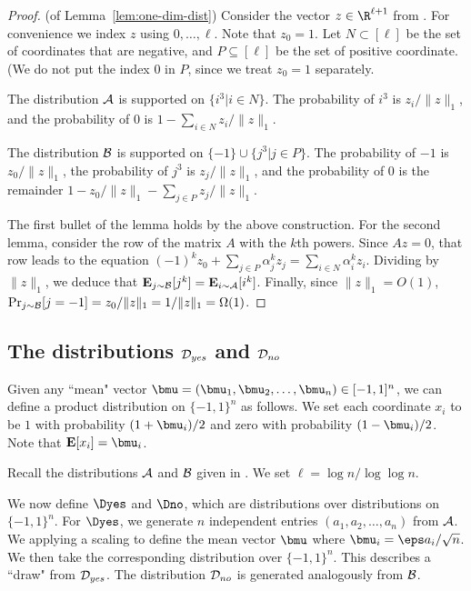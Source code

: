 \begin{proof} (of Lemma~\ref{lem:one-dim-dist}) Consider the vector $z \in \R^{\ell+1}$ from .
For convenience we index $z$ using $0, \ldots,\ell$. Note that $z_0 = 1$. Let $N \subset [\ell]$ be the 
set of coordinates that are negative, and $P \subseteq [\ell]$ be the set of positive coordinate. (We do 
not put the index $0$ in $P$, since we treat $z_0 = 1$ separately.

The distribution ${\cal A}$ is supported on $\{i^3 | i \in N\}$. The probability of $i^3$ is $z_i/\|z\|_1$,
and the probability of $0$ is $1 - \sum_{i \in N} z_i/\|z\|_1$.

The distribution $\mathcal{B}$ is supported on $\{-1\} \cup \{j^3 | j \in P\}$. The probability of $-1$ is $z_0/\|z\|_1$,
the probability of $j^3$ is $z_j/\|z\|_1$, and the probability of $0$ is the remainder $1 - z_0/\|z\|_1 - \sum_{j \in P} z_j/\|z\|_1$.

The first bullet of the lemma holds by the above construction. For the second lemma, consider the row of the matrix $A$
with the $k$th powers. Since $Az = 0$, that row leads to the equation $(-1)^k z_0 + \sum_{j \in P} \alpha^k_j z_j = \sum_{i \in N} \alpha^k_i z_i$.
Dividing by $\|z\|_1$, we deduce that $\hbox{\bf E}_{j \sim \mathcal{B}}[j^k] = \hbox{\bf E}_{i \sim {\cal A}} [i^k]$.
Finally, since $\|z\|_1 = O(1)$, $\Pr_{j \sim \mathcal{B}}[j = -1] = z_0/\|z\|_1 = 1/\|z\|_1 = \Omega(1)$.
\end{proof}

\subsection{The distributions $\mathcal{D}_{yes}$ and $\mathcal{D}_{no}$} \label{sec:dist}

Given any ``mean" vector $\bmu = (\bmu_1, \bmu_2, \ldots, \bmu_n) \in [-1,1]^n$, we can define a product distribution
on $\{-1,1\}^n$ as follows. We set each coordinate $x_i$ to be $1$ with probability $(1+\bmu_i)/2$ and zero 
with probability $(1-\bmu_i)/2$. Note that $\EX[x_i] = \bmu_i$.

Recall the distributions ${\cal A}$ and $\mathcal{B}$ given in . 
We set $\ell = \log n/\log\log n$.

We now define $\Dyes$ and $\Dno$, which are distributions over 
distributions on $\{-1,1\}^n$. For $\Dyes$,
we generate $n$ independent entries $(a_1, a_2, \ldots, a_n)$ from ${\cal A}$. 
We applying a scaling to define the mean vector $\bmu$ where $\bmu_i = \eps a_i/\sqrt{n}$.
We then take the corresponding distribution over $\{-1,1\}^n$. This describes a ``draw"
from $\mathcal{D}_{yes}$.
The distribution $\mathcal{D}_{no}$ is generated analogously from $\mathcal{B}$.

